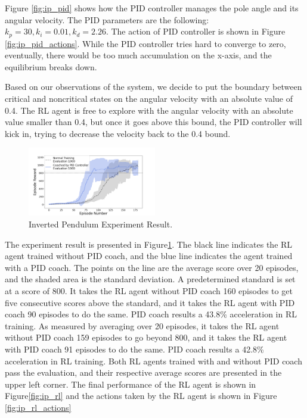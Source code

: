 \documentclass{IJCAS}
\begin{document}
Figure \ref{fig:ip_pid} shows how the PID controller manages the pole angle and its angular velocity. The PID parameters are the following: $k_p=30,k_i=0.01,k_d=2.26$. The action of PID controller is shown in Figure \ref{fig:ip_pid_actions}. While the PID controller tries hard to converge to zero, eventually, there would be too much accumulation on the x-axis, and the equilibrium breaks down.

Based on our observations of the system, we decide to put the boundary between critical and noncritical states on the angular velocity with an absolute value of 0.4. The RL agent is free to explore with the angular velocity with an absolute value smaller than 0.4, but once it goes above this bound, the PID controller will kick in, trying to decrease the velocity back to the 0.4 bound.

\begin{figure}[H]
\centering
\includegraphics[width=0.5\textwidth]{ip.png}
\caption{Inverted Pendulum Experiment Result. }
\label{fig:ip_result}
\end{figure}

The experiment result is presented in Figure\ref{fig:ip_result}. The black line indicates the RL agent trained without PID coach, and the blue line indicates the agent trained with a PID coach. The points on the line are the average score over 20 episodes, and the shaded area is the standard deviation. A predetermined standard is set at a score of 800. It takes the RL agent without PID coach 160 episodes to get five consecutive scores above the standard, and it takes the RL agent with PID coach 90 episodes to do the same. PID coach results a 43.8\% acceleration in RL training. As measured by averaging over 20 episodes, it takes the RL agent without PID coach 159 episodes to go beyond 800, and it takes the RL agent with PID coach 91 episodes to do the same. PID coach results a 42.8\% acceleration in RL training. Both RL agents trained with and without PID coach pass the evaluation, and their respective average scores are presented in the upper left corner. The final performance of the RL agent is shown in Figure\ref{fig:ip_rl} and the actions taken by the RL agent is shown in Figure \ref{fig:ip_rl_actions}
\end{document}
